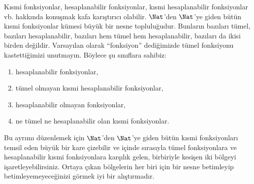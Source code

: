 \documentclass[../../../include/open-logic-section]{subfiles}
\begin{document}
Kısmi fonksiyonlar, hesaplanabilir fonksiyonlar, kısmi hesaplanabilir
fonksiyonlar vb. hakkında konuşmak kafa karıştırıcı olabilir. $\Nat$'den
$\Nat$'ye giden bütün kısmi fonksiyonlar kümesi büyük bir nesne
topluluğudur. Bunların bazıları tümel, bazıları hesaplanabilir, bazıları hem
tümel hem hesaplanabilir, bazıları da ikisi birden değildir. Varsayılan olarak
``fonksiyon'' dediğimizde tümel fonksiyonu kastettiğimizi unutmayın. Böylece
şu sınıflara sahibiz:
\begin{enumerate}
\item hesaplanabilir fonksiyonlar,
\item tümel olmayan kısmi hesaplanabilir fonksiyonlar,
\item hesaplanabilir olmayan fonksiyonlar,
\item ne tümel ne hesaplanabilir olan kısmi fonksiyonlar.
\end{enumerate}
Bu ayrımı düzenlemek için $\Nat$'den $\Nat$'ye giden bütün kısmi
fonksiyonları temsil eden büyük bir kare çizebilir ve içinde sırasıyla tümel
fonksiyonlara ve hesaplanabilir kısmi fonksiyonlara karşılık gelen, birbiriyle
kesişen iki bölgeyi işaretleyebilirsiniz. Ortaya çıkan bölgelerin her biri
için bir nesne betimleyip betimleyemeyeceğinizi görmek iyi bir alıştırmadır.
\end{document}
